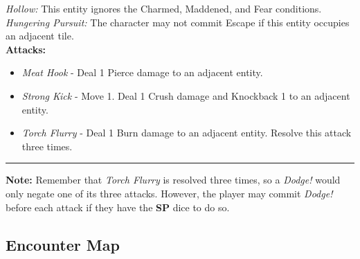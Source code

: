 \emph{Hollow:} This entity ignores the Charmed, Maddened, and Fear conditions.\\

\emph{Hungering Pursuit:} The character may not commit Escape if this entity occupies an adjacent tile.\\

\textbf{Attacks:}
\begin{itemize}
\item \emph{Meat Hook} - Deal 1 Pierce damage to an adjacent entity.
\item \emph{Strong Kick} - Move 1. Deal 1 Crush damage and Knockback 1 to an adjacent entity.
\item \emph{Torch Flurry} - Deal 1 Burn damage to an adjacent entity. Resolve this attack three times.
\end{itemize}
\hrule

\begin{tcolorbox}
\textbf{Note:} Remember that \emph{Torch Flurry} is resolved three times, so a \emph{Dodge!} would only negate one of its three attacks. However, the player may commit \emph{Dodge!} before each attack if they have the \textbf{SP} dice to do so.
\end{tcolorbox}

\subsection*{Encounter Map}

\begin{center}
\end{center}

